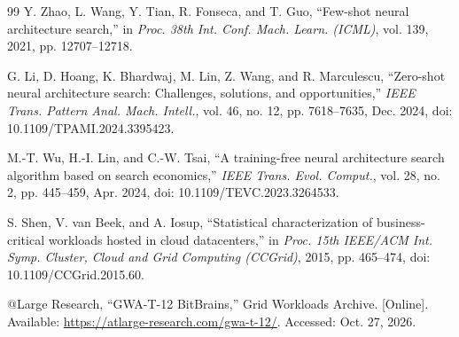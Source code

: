 \documentclass[a4paper,fleqn]{cas-sc}
\begin{document}
\begin{thebibliography}{99}
Y. Zhao, L. Wang, Y. Tian, R. Fonseca, and T. Guo, ``Few-shot neural architecture search,'' in \emph{Proc. 38th Int. Conf. Mach. Learn. (ICML)}, vol. 139, 2021, pp. 12707--12718.

G. Li, D. Hoang, K. Bhardwaj, M. Lin, Z. Wang, and R. Marculescu, ``Zero-shot neural architecture search: Challenges, solutions, and opportunities,'' \emph{IEEE Trans. Pattern Anal. Mach. Intell.}, vol. 46, no. 12, pp. 7618--7635, Dec. 2024, doi: 10.1109/TPAMI.2024.3395423.

M.-T. Wu, H.-I. Lin, and C.-W. Tsai, ``A training-free neural architecture search algorithm based on search economics,'' \emph{IEEE Trans. Evol. Comput.}, vol. 28, no. 2, pp. 445--459, Apr. 2024, doi: 10.1109/TEVC.2023.3264533.

S. Shen, V. van Beek, and A. Iosup,
``Statistical characterization of business-critical workloads hosted in
cloud datacenters,'' in \emph{Proc. 15th IEEE/ACM Int. Symp. Cluster, Cloud
and Grid Computing (CCGrid)}, 2015, pp. 465--474,
doi: 10.1109/CCGrid.2015.60.

@Large Research, ``GWA-T-12 BitBrains,''
Grid Workloads Archive. [Online]. Available:
\url{https://atlarge-research.com/gwa-t-12/}. Accessed: Oct. 27, 2026.
\end{thebibliography}
\end{document}
